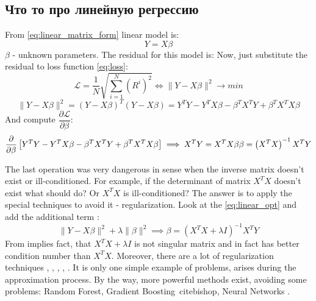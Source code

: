 \subsection{Что то про линейную регрессию}
From \eqref{eq:linear_matrix_form} linear model is:
\begin{equation*}
	Y = X \beta
\end{equation*}
$\beta$ - unknown parameters. The residual for this model is:
Now, just substitute the residual to loss function \eqref{eq:loss}:
\begin{equation*}
	\mathcal{L} = \dfrac{1}{N} \sqrt{\sum_{i = 1}^N \left ( R^i \right )^2} \Leftrightarrow \| Y - X \beta \|^2 \rightarrow min
\end{equation*}
\begin{equation}
	\| Y - X \beta \|^2 = \left ( Y - X \beta \right )^T \left ( Y - X \beta \right ) =  Y^T Y - Y^T X \beta - \beta^T X^T Y + \beta^T X^T X \beta
	\label{eq:linear_opt}
\end{equation}
And compute $\dfrac{\partial \mathcal{L}}{\partial \beta}$:
\begin{equation*}
	\dfrac{\partial }{\partial \beta} \left [ Y^T Y - Y^T X \beta - \beta^T X^T Y + \beta^T X^T X \beta \right ] \implies X^T Y =  X^T X \beta \\
	\beta = \left ( X^T X \right )^{-1} X^T Y
\end{equation*}

The last operation was very dangerous in sense when the inverse matrix doesn't exist or ill-conditioned. For example, if the determinant of matrix $X^T X$ doesn't exist what should do? Or $X^T X$ is ill-conditioned?
The answer is to apply the special techniques to avoid it - regularization. 
Look at the \eqref{eq:linear_opt} and add the additional term \cite{kress2012numerical}:
\begin{equation}
	\| Y - X \beta \|^2 + \lambda \| \beta \|^2 \implies \beta = \left ( X^T X + \lambda I \right )^{-1} X^T Y
\end{equation}
From \cite{kress2012numerical} implies fact, that $X^T X + \lambda I$ is not singular matrix and in fact has better condition number than $X^T X$. Moreover, there are a lot of regularization techniques \cite{ridge}, \cite{lasso}, \cite{dantzig_selector}, \cite{rlad}, \cite{slope}. 
It is only one simple example of problems, arises during the approximation process. By the way, more powerful methods exist, avoiding some problems: Random Forest, Gradient Boosting\ cite{bishop}, Neural Networks \cite{haykin}.
